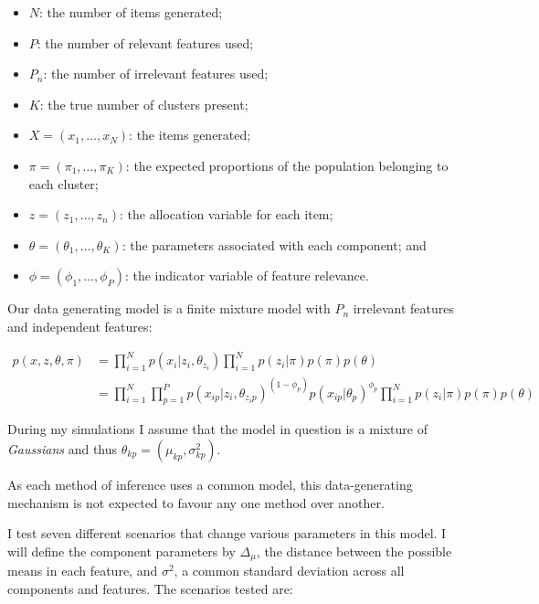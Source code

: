 \documentclass[
]{book}
\providecommand{\tightlist}{%
  \setlength{\itemsep}{0pt}\setlength{\parskip}{0pt}}
\begin{document}
\begin{itemize}
\tightlist
\item
  \(N\): the number of items generated;
\item
  \(P\): the number of relevant features used;
\item
  \(P_n\): the number of irrelevant features used;
\item
  \(K\): the true number of clusters present;
\item
  \(X = (x_1, \ldots, x_N)\): the items generated;
\item
  \(\pi=(\pi_1, \ldots, \pi_K)\): the expected proportions of the population belonging to each cluster;
\item
  \(z=(z_1, \ldots, z_n)\): the allocation variable for each item;
\item
  \(\theta=(\theta_1, \ldots, \theta_K)\): the parameters associated with each component; and
\item
  \(\phi=(\phi_1,\ldots, \phi_P)\): the indicator variable of feature relevance.
\end{itemize}

Our data generating model is a finite mixture model with \(P_n\) irrelevant features and independent features:

\[
\begin{aligned}
p(x, z, \theta, \pi) &= \prod_{i=1}^N p(x_i | z_i, \theta_{z_i}) \prod_{i=1}^N p (z_i | \pi) p(\pi) p(\theta) \\
  &= \prod_{i=1}^N \prod_{p=1}^P p(x_{ip} | z_i, \theta_{z_ip})^{(1 - \phi_p)} p(x_{ip} | \theta_p) ^ {\phi_p} \prod_{i=1}^N p (z_i | \pi) p(\pi) p(\theta)
\end{aligned}
\]

During my simulations I assume that the model in question is a mixture of \emph{Gaussians} and thus \(\theta_{kp}=(\mu_{kp}, \sigma^2_{kp})\).

As each method of inference uses a common model, this data-generating mechanism is not expected to favour any one method over another.

I test seven different scenarios that change various parameters in this model. I will define the component parameters by \(\Delta_{\mu}\), the distance between the possible means in each feature, and \(\sigma^2\), a common standard deviation across all components and features. The scenarios tested are:
\end{document}
